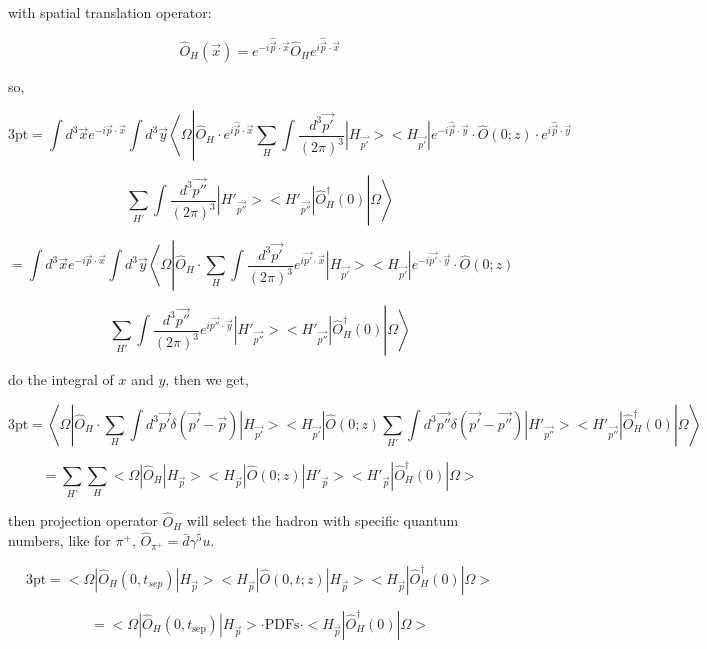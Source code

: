\documentclass[11pt]{article} %
\begin{document}
with spatial translation operator:

\[ \hat{O}_{H}(\vec{x}) = e^{-i \hat{\vec{p}} \cdot \vec{x}} \hat{O}_{H} e^{i \hat{\vec{p}} \cdot \vec{x}} \]

so,

\[ \text{3pt} = \int d^{3} \vec{x} e^{-i \vec{p} \cdot \vec{x}} \int d^3 \vec{y}\left\langle\Omega\left|\hat{O}_{H} \cdot e^{i \hat{\vec{p}} \cdot \vec{x}} \sum_{H} \int \frac{d^3 \vec{p'}}{(2\pi)^3}  |H_{\vec{p'}}><H_{\vec{p'}}| e^{-i \hat{\vec{p}} \cdot \vec{y}} \cdot \hat{O}(0; z) \cdot e^{i \hat{\vec{p}} \cdot \vec{y}} \right. \right. \]
    
\[ \left. \left. \sum_{H'} \int \frac{d^3 \vec{p''}}{(2\pi)^3} |H'_{\vec{p''}}><H'_{\vec{p''}}| \hat{O}_{H}^{\dagger}(0)  \right| \Omega\right\rangle \]

\[= \int d^{3} \vec{x} e^{-i \vec{p} \cdot \vec{x}} \int d^3 \vec{y}\left\langle\Omega\left|\hat{O}_{H} \cdot \sum_{H} \int \frac{d^3 \vec{p'}}{(2\pi)^3} e^{i \vec{p'} \cdot \vec{x}} |H_{\vec{p'}}><H_{\vec{p'}}| e^{-i \vec{p'} \cdot \vec{y}} \cdot \hat{O}(0; z) \right. \right.\]

\[ \left. \left. \sum_{H'} \int \frac{d^3 \vec{p''}}{(2\pi)^3} e^{i \vec{p''} \cdot \vec{y}} |H'_{\vec{p''}}><H'_{\vec{p''}}| \hat{O}_{H}^{\dagger}(0)  \right| \Omega\right\rangle \]

do the integral of $x$ and $y$, then we get,

\[ \text{3pt} = \left\langle\Omega\left|\hat{O}_{H} \cdot \sum_{H} \int d^3 \vec{p'} \delta(\vec{p'} - \vec{p} ) |H_{\vec{p'}}><H_{\vec{p'}}| \hat{O}(0; z)  \sum_{H'} \int d^3 \vec{p''}  \delta(\vec{p'} - \vec{p''}) |H'_{\vec{p''}}><H'_{\vec{p''}}| \hat{O}_{H}^{\dagger}(0)  \right| \Omega\right\rangle \]

\[ = \sum_{H'} \sum_{H} <\Omega |\hat{O}_{H}  |H_{\vec{p}}><H_{\vec{p}}| \hat{O}(0; z) |H'_{\vec{p}}><H'_{\vec{p}}| \hat{O}_{H}^{\dagger}(0) | \Omega> \]


then projection operator $\hat{O}_{H}$ will select the hadron with specific quantum numbers, like for $\pi^+$, $\hat{O}_{\pi^+} = \bar{d} \gamma^5 u$.

\[ \text{3pt} = <\Omega |\hat{O}_{H} (0, t_{sep})  |H_{\vec{p}}><H_{\vec{p}}| \hat{O}(0, t; z) |H_{\vec{p}}><H_{\vec{p}}| \hat{O}_{H}^{\dagger}(0) | \Omega> \]

\[ = <\Omega |\hat{O}_{H} (0, t_{\text{sep}})  |H_{\vec{p}}> \cdot \text{PDFs} \cdot <H_{\vec{p}}| \hat{O}_{H}^{\dagger}(0) | \Omega> \]
\end{document}
